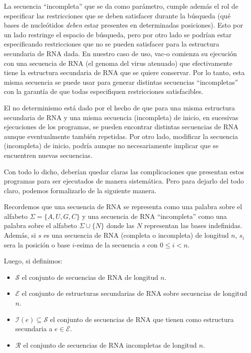 La secuencia ``incompleta'' que se da como par\'ametro, cumple adem\'as el rol
de especificar las restricciones que se deben satisfacer durante la b\'usqueda
(qu\'e bases de nucle\'otidos \textit{deben} estar presentes en determinadas
posiciones). Esto por un lado restringe el espacio de b\'usqueda, pero por otro
lado se podr\'ian estar especificando restricciones que no se pueden satisfacer
para la estructura secundaria de \ac{RNA} dada. En nuestro caso de uso,
\ac{vac-o} comienza su ejecuci\'on con una secuencia de \ac{RNA} (el genoma del
virus atenuado) que efectivamente tiene la estructura secundaria de \ac{RNA} que
se quiere conservar. Por lo tanto, esta misma secuencia se puede usar para
generar distintas secuencias ``incompletas'' con la garant\'ia de que todas
especifiquen restricciones satisfacibles.

El no determinismo est\'a dado por el hecho de que para una misma estructura
secundaria de \ac{RNA} y una misma secuencia (incompleta) de inicio, en
sucesivas ejecuciones de los programas, se pueden encontrar distintas secuencias
de \ac{RNA} aunque eventualmente tambi\'en repetidas. Por otro lado, modificar
la secuencia (incompleta) de inicio, podr\'ia aunque no necesariamente implicar
que se encuentren nuevas secuencias.

Con todo lo dicho, deber\'ian quedar claras las complicaciones que presentan
estos programas para ser ejecutados de manera sistem\'atica. Pero para dejarlo
del todo claro, podemos formalizarlo de la siguiente manera.

Recordemos que una secuencia de \ac{RNA} se representa como una palabra sobre el
alfabeto $\Sigma = \{A,U,G,C\}$ y una secuencia de \ac{RNA} ``incompleta'' como
una palabra sobre el alfabeto $\Sigma \cup \{N\}$ donde las $N$ representan las
bases indefinidas. Adem\'as, si $s$ es una secuencia de \ac{RNA} (completa o
incompleta) de longitud $n$, $s_{i}$ sera la posici\'on o base $i$-esima de la
secuencia $s$ con $0 \leq i < n$.

Luego, si definimos:
\begin{itemize}
 \item $\mathcal{S}$ el conjunto de secuencias de \ac{RNA} de longitud $n$.
 \item $\mathcal{E}$ el conjunto de estructuras secundarias de \ac{RNA} sobre
secuencias de longitud $n$. 
 \item $\mathcal{I}(e) \subseteq \mathcal{S}$ el conjunto de secuencias de
\ac{RNA} que tienen como estructura secundaria a $e \in \mathcal{E}$.
 \item $\mathcal{R}$ el conjunto de secuencias de \ac{RNA} incompletas de
longitud $n$.
\end{itemize}


